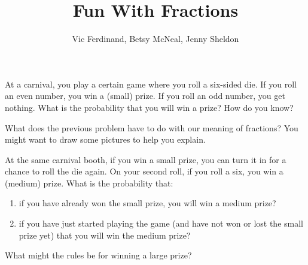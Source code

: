 \documentclass{ximera}
\title{Fun With Fractions}
\author{Vic Ferdinand, Betsy McNeal, Jenny Sheldon}
\begin{document}
\begin{abstract}
\end{abstract}
\maketitle



\begin{problem}
At a carnival, you play a certain game where you roll a six-sided die.  If you roll an even number, you win a (small) prize.  If you roll an odd number, you get nothing.  What is the probability that you will win a prize?  How do you know?
\end{problem}

\begin{problem}
What does the previous problem have to do with our meaning of fractions?  You might want to draw some pictures to help you explain.
\end{problem}

\begin{problem}
At the same carnival booth, if you win a small prize, you can turn it in for a chance to roll the die again.  On your second roll, if you roll a six, you win a (medium) prize.  What is the probability that:
\begin{enumerate}
\item if you have already won the small prize, you will win a medium prize?
\item if you have just started playing the game (and have not won or lost the small prize yet) that you will win the medium prize?
\end{enumerate}

\end{problem}

\begin{problem}
What might the rules be for winning a large prize?
\end{problem}
\end{document}
